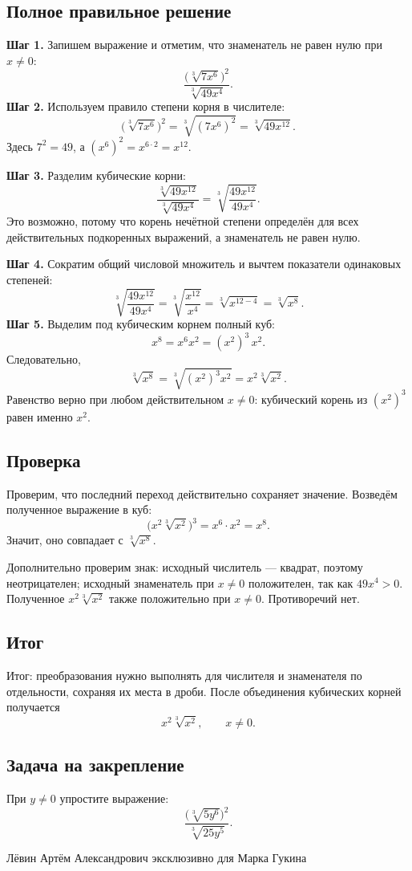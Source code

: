 \documentclass[11pt,a4paper]{article}
\begin{document}
\subsection*{Полное правильное решение}
\textbf{Шаг 1.} Запишем выражение и отметим, что знаменатель
не равен нулю при $x\ne0$:
\[
\frac{\bigl(\sqrt[3]{7x^6}\bigr)^2}{\sqrt[3]{49x^4}}.
\]
\textbf{Шаг 2.} Используем правило степени корня в числителе:
\[
\bigl(\sqrt[3]{7x^6}\bigr)^2
=\sqrt[3]{(7x^6)^2}
=\sqrt[3]{49x^{12}}.
\]
Здесь $7^2=49$, а $(x^6)^2=x^{6\cdot2}=x^{12}$.

\textbf{Шаг 3.} Разделим кубические корни:
\[
\frac{\sqrt[3]{49x^{12}}}{\sqrt[3]{49x^4}}
=\sqrt[3]{\frac{49x^{12}}{49x^4}}.
\]
Это возможно, потому что корень нечётной степени определён
для всех действительных подкоренных выражений, а знаменатель
не равен нулю.

\textbf{Шаг 4.} Сократим общий числовой множитель и вычтем
показатели одинаковых степеней:
\[
\sqrt[3]{\frac{49x^{12}}{49x^4}}
=\sqrt[3]{\frac{x^{12}}{x^4}}
=\sqrt[3]{x^{12-4}}
=\sqrt[3]{x^8}.
\]
\textbf{Шаг 5.} Выделим под кубическим корнем полный куб:
\[
x^8=x^6x^2=(x^2)^3\,x^2.
\]
Следовательно,
\[
\sqrt[3]{x^8}
=\sqrt[3]{(x^2)^3x^2}
=x^2\sqrt[3]{x^2}.
\]
Равенство верно при любом действительном $x\ne0$:
кубический корень из $(x^2)^3$ равен именно $x^2$.
\subsection*{Проверка}
Проверим, что последний переход действительно сохраняет значение.
Возведём полученное выражение в куб:
\[
\bigl(x^2\sqrt[3]{x^2}\bigr)^3
=x^6\cdot x^2=x^8.
\]
Значит, оно совпадает с $\sqrt[3]{x^8}$.

Дополнительно проверим знак: исходный числитель --- квадрат,
поэтому неотрицателен; исходный знаменатель при $x\ne0$
положителен, так как $49x^4>0$. Полученное
$x^2\sqrt[3]{x^2}$ также положительно при $x\ne0$.
Противоречий нет.
\subsection*{Итог}
\textcolor{teal!60!black}{Итог:} преобразования нужно
выполнять для числителя и знаменателя по отдельности,
сохраняя их места в дроби. После объединения кубических
корней получается
\[
\boxed{x^2\sqrt[3]{x^2}},\qquad x\ne0.
\]
\subsection*{Задача на закрепление}
При $y\ne0$ упростите выражение:
\[
\frac{\bigl(\sqrt[3]{5y^6}\bigr)^2}{\sqrt[3]{25y^5}}.
\]

\vfill
\begin{center}
\small Лёвин Артём Александрович эксклюзивно для Марка Гукина
\end{center}
\end{document}
